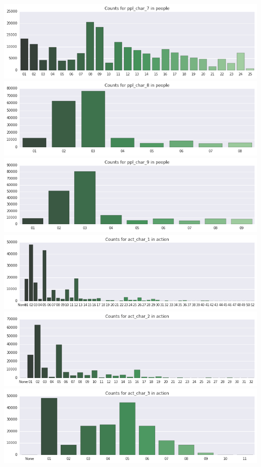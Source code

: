 \documentclass[]{report}
\begin{document}
\includegraphics{assets/img/BarPlots_5_5.png}
\includegraphics{assets/img/BarPlots_5_6.png}
\includegraphics{assets/img/BarPlots_5_7.png}
\includegraphics{assets/img/BarPlots_6_0.png}
\includegraphics{assets/img/BarPlots_6_1.png}
\includegraphics{assets/img/BarPlots_6_2.png}
\end{document}
